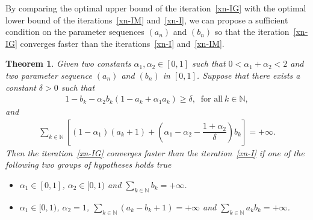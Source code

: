 \documentclass[a4paper, 11pt]{article}
\newtheorem{theorem}{Theorem}[section]
\begin{document}
By comparing the optimal upper bound of the iteration~\eqref{xn-IG} with the optimal lower bound of the iterations~\eqref{xn-IM} and~\eqref{xn-I}, we can propose a sufficient condition on the parameter sequences $(a_n)$ and $(b_n)$ so that the iteration~\eqref{xn-IG} converges faster than the iterations~\eqref{xn-I} and~\eqref{xn-IM}. 
\begin{theorem}\label{theo-IG-and-I}
Given two constants $\alpha_1,\alpha_2 \in [0,1]$ such that $0<\alpha_1+\alpha_2<2$ and two parameter sequence $(a_n)$ and $(b_n)$ in $[0,1]$. Suppose that there exists a constant $\delta>0$ such that
\begin{align}\label{cond:I-IG-1}
	1-b_k-\alpha_2b_k(1-a_k+\alpha_1a_k)\ge\delta, \ \text{ for all} \ k \in \mathbb{N},
\end{align}
and
\begin{align}\label{cond:I-IG-2}
	\displaystyle\sum_{k \in \mathbb{N}}{\left[(1-\alpha_1)(a_k+1)+\left(\alpha_1-\alpha_2-\displaystyle\dfrac{1+\alpha_2}{\delta}\right)b_k\right]}=+\infty.
\end{align}
Then the iteration~\eqref{xn-IG} converges faster than the iteration~\eqref{xn-I} if one of the following two groups of hypotheses holds true
\begin{itemize}
\item[i)] $\alpha_1 \in [0,1]$, $\alpha_2 \in [0,1)$ and $\displaystyle\sum_{k \in \mathbb{N}}{b_k}=+\infty$.
\item[ii)] $\alpha_1 \in [0,1)$, $\alpha_2=1$, $\displaystyle\sum_{k \in \mathbb{N}}(a_k-b_k+1)=+\infty$ and $\displaystyle\sum_{k \in \mathbb{N}}a_kb_k=+\infty$.
\end{itemize}
\end{theorem}
\end{document}
